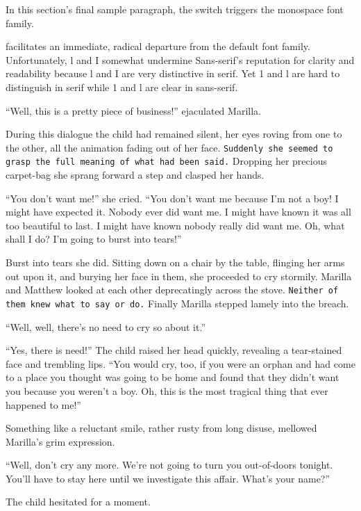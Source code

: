 \documentclass[a4paper]{article}
\begin{document}
In this section's final sample paragraph, \ttfamily the switch triggers the monospace font family. \textrm{} \textsf{}

facilitates an immediate, radical departure from the default font family. Unfortunately, l and I somewhat undermine Sans-serif's reputation for clarity and readability \textrm{because l and I are very distinctive in serif. Yet 1 and l are hard to distinguish in serif} while 1 and l are clear in sans-serif.

\sffamily``Well, this is a pretty piece of business!'' ejaculated Marilla.

\textrm{During this dialogue the child had remained silent, her eyes roving from one to the other, all the animation fading out of her face. \texttt{Suddenly she seemed to grasp the full meaning of what had been said.} Dropping her precious carpet-bag she sprang forward a step and clasped her hands.}

``You don't want me!'' she cried. ``You don't want me because I'm not a boy! I might have expected it. Nobody ever did want me. I might have known it was all too beautiful to last. I might have known nobody really did want me. \rmfamily Oh, what shall I do? I'm going to burst into tears!''

Burst into tears she did. \textsf{Sitting down on a chair by the table, flinging her arms out upon it, and burying her face in them, she proceeded to cry stormily.} Marilla and Matthew looked at each other deprecatingly across the stove. \texttt{Neither of them knew what to say or do.} Finally Marilla stepped lamely into the breach.

``Well, well, there's no need to cry so about it.''

``Yes, there is need!'' \ttfamily The child raised her head quickly, revealing a tear-stained face and trembling lips. ``You would cry, too, if you were an orphan and had come to a place you thought was going to be home and found that they didn't want you because you weren't a boy. Oh, this is the most tragical thing that ever happened to me!''

Something like a reluctant smile, rather rusty from long disuse, mellowed Marilla's grim expression.

``Well, don't cry any more. We're not going to turn you out-of-doors tonight. You'll have to stay here until we investigate this affair. What's your name?''

The child hesitated for a moment.
\end{document}
